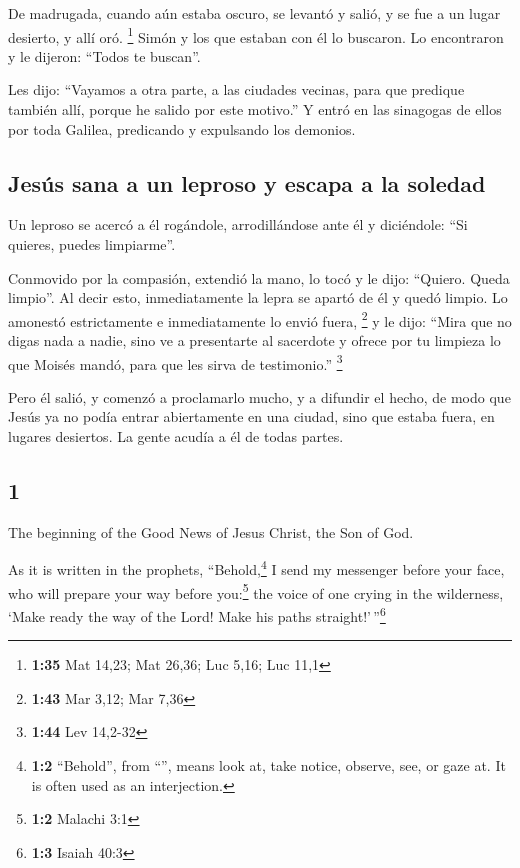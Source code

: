 \begin{paracol}{2}
 De madrugada, cuando aún estaba oscuro, se levantó y
salió, y se fue a un lugar desierto, y allí oró. \footnote{\textbf{1:35}
  Mat 14,23; Mat 26,36; Luc 5,16; Luc 11,1}  Simón y los
que estaban con él lo buscaron.  Lo encontraron y le
dijeron: ``Todos te buscan''.

 Les dijo: ``Vayamos a otra parte, a las ciudades
vecinas, para que predique también allí, porque he salido por este
motivo.''  Y entró en las sinagogas de ellos por toda
Galilea, predicando y expulsando los demonios.

\hypertarget{jesuxfas-sana-a-un-leproso-y-escapa-a-la-soledad}{%
\subsection{Jesús sana a un leproso y escapa a la
soledad}\label{jesuxfas-sana-a-un-leproso-y-escapa-a-la-soledad}}

 Un leproso se acercó a él rogándole, arrodillándose ante
él y diciéndole: ``Si quieres, puedes limpiarme''.

 Conmovido por la compasión, extendió la mano, lo tocó y
le dijo: ``Quiero. Queda limpio''.  Al decir esto,
inmediatamente la lepra se apartó de él y quedó limpio. 
Lo amonestó estrictamente e inmediatamente lo envió fuera, \footnote{\textbf{1:43}
  Mar 3,12; Mar 7,36}  y le dijo: ``Mira que no digas
nada a nadie, sino ve a presentarte al sacerdote y ofrece por tu
limpieza lo que Moisés mandó, para que les sirva de testimonio.''
\footnote{\textbf{1:44} Lev 14,2-32}

 Pero él salió, y comenzó a proclamarlo mucho, y a
difundir el hecho, de modo que Jesús ya no podía entrar abiertamente en
una ciudad, sino que estaba fuera, en lugares desiertos. La gente acudía
a él de todas partes.

\switchcolumn
\begin{otherlanguage}{english}

\hypertarget{section-1}{%
\section{1}\label{section-1}}

 The beginning of the Good News of Jesus Christ, the Son
of God.

 As it is written in the prophets, ``Behold,\footnote{\textbf{1:2}
  ``Behold'', from ``'', means look at, take notice,
  observe, see, or gaze at. It is often used as an interjection.} I send
my messenger before your face, who will prepare your way before
you:\footnote{\textbf{1:2} Malachi 3:1}  the voice of one
crying in the wilderness, `Make ready the way of the Lord! Make his
paths straight!'\,''\footnote{\textbf{1:3} Isaiah 40:3}


\end{otherlanguage}
\end{paracol}
